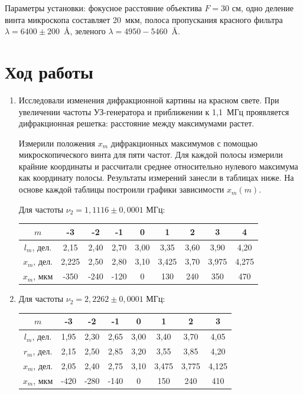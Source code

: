 \documentclass[a4paper,12pt]{article}
\begin{document}
    Параметры установки: фокусное расстояние объектива $F = 30 $ см, одно деление винта микроскопа составляет 20~мкм, полоса пропускания красного фильтра \mbox{$\lambda = 6400\pm 200$ Å}, зеленого \mbox{$\lambda = 4950-5460$ Å}.
	
	\section*{Ход работы}
	\begin{enumerate}
	    \item Исследовали изменения дифракционной картины на красном свете. При увеличении частоты УЗ-генератора и приближении к 1,1~МГц проявляется дифракционная решетка: расстояние между максимумами растет.
	    
	    Измерили положения $ x_m $ дифракционных максимумов с помощью микроскопического винта для пяти частот. Для каждой полосы измерили крайние координаты и рассчитали среднее относительно нулевого максимума как координату полосы. Результаты измерений занесли в таблицах ниже. На основе каждой таблицы построили графики зависимости $ x_m (m) $.
	    
	    Для частоты $\nu_2=1{,}1116\pm 0{,}0001$ МГц:
	    \begin{center}
	    \begin{tabular}{|c|c|c|c|c|c|c|c|c|}
            \hline
            $m$ & -3 & -2 & -1 & 0 & 1 & 2 & 3 & 4 \\ \hline
            $l_m$, дел. & 2,15 & 2,40 & 2,70 & 3,00 & 3,35 & 3,60 & 3,90 & 4,20 \\ \hline
            $x_m$, дел. & 2,225 & 2,50 & 2,80 & 3,10 & 3,425 & 3,70 & 3,975 & 4,275 \\ \hline
            $x_m$, мкм & -350 & -240 & -120 & 0 & 130 & 240 & 350 & 470 \\ \hline
        \end{tabular}
	    \end{center}

	\item Для частоты $\nu_2=2{,}2262\pm 0{,}0001$ МГц:
	    \begin{center}
	    \begin{tabular}{|c|c|c|c|c|c|c|c|}
            \hline
            $m$ & -3 & -2 & -1 & 0 & 1 & 2 & 3 \\ \hline
            $l_m$, дел. & 1,95 & 2,30 & 2,65 & 3,00 & 3,40 & 3,70 & 4,05 \\ \hline
            $r_m$, дел. & 2,15 & 2,50 & 2,85 & 3,20 & 3,55 & 3,85 & 4,20 \\ \hline
            $x_m$, дел. & 2,05 & 2,40 & 2,75 & 3,10 & 3,475 & 3,775 & 4,125 \\ \hline
            $x_m$, мкм & -420 & -280 & -140 & 0 & 150 & 240 & 410 \\ \hline
        \end{tabular}
	    \end{center}


\end{enumerate}
\end{document}
